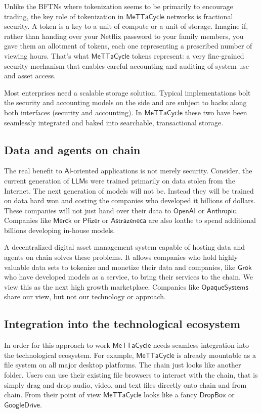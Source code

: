 \documentclass{article}
\newcommand{\MC}{\mathsf{MeTTaCycle}}
\begin{document}
Unlike the BFTNs where tokenization seems to be primarily to encourage
trading, the key role of tokenization in $\MC$ networks is
fractional security. A token is a key to a unit of compute or a unit
of storage. Imagine if, rather than handing over your Netflix password
to your family members, you gave them an allotment of tokens, each one
representing a prescribed number of viewing hours. That’s what
$\MC$ tokens represent: a very fine-grained security mechanism
that enables careful accounting and auditing of system use and asset
access.

Most enterprises need a scalable storage solution. Typical
implementations bolt the security and accounting models on the side
and are subject to hacks along both interfaces (security and
accounting). In $\MC$ these two have been seamlessly integrated and
baked into searchable, transactional storage.

\subsection{Data and agents on chain}
The real benefit to $\mathsf{AI}$-oriented applications is not merely
security. Consider, the current generation of $\mathsf{LLM}$s were
trained primarily on data stolen from the Internet. The next
generation of models will not be. Instead they will be trained on data
hard won and costing the companies who developed it billions of
dollars. These companies will not just hand over their data to
$\mathsf{OpenAI}$ or $\mathsf{Anthropic}$. Companies like
$\mathsf{Merck}$ or $\mathsf{Pfizer}$ or $\mathsf{Astrazeneca}$ are
also loathe to spend additional billions developing in-house models.

A decentralized digital asset management system capable of hosting
data and agents on chain solves these problems. It allows companies
who hold highly valuable data sets to tokenize and monetize their data
and companies, like $\mathsf{Grok}$ who have developed models as a
service, to bring their services to the chain. We view this as the
next high growth marketplace. Companies like $\mathsf{OpaqueSystems}$ share
our view, but not our technology or approach.

\subsection{Integration into the technological ecosystem}

In order for this approach to work $\MC$ needs seamless integration
into the technological ecosystem. For example, $\MC$ is already
mountable as a file system on all major desktop platforms. The chain
just looks like another folder. Users can use their existing file
browsers to interact with the chain, that is simply drag and drop
audio, video, and text files directly onto chain and from chain. From
their point of view $\MC$ looks like a fancy $\mathsf{DropBox}$ or
$\mathsf{GoogleDrive}$.
\end{document}
